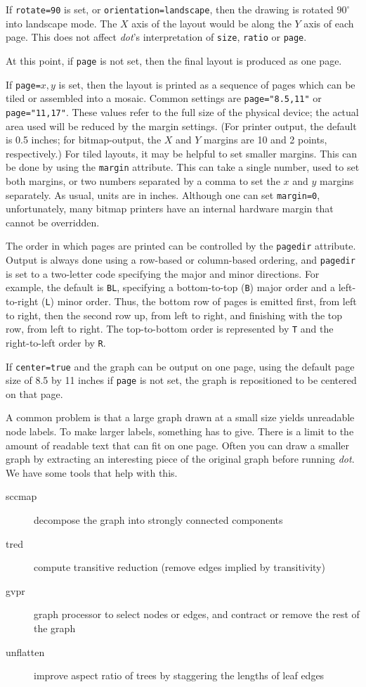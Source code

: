 \documentclass[11pt]{article}
\def\dot{{\it dot}}
\begin{document}
If \verb"rotate=90" is set, or {\tt orientation=landscape}, 
then the drawing is rotated $90^\circ$ into landscape mode.
The $X$ axis of the layout would be along the $Y$ axis of each page.
This does not affect \dot's interpretation of \verb"size",
\verb"ratio" or \verb"page".

At this point, if \verb"page" is not set, then the final layout is
produced as one page.

If \verb"page="$x,y$ is set, then the layout is printed as a sequence
of pages which can be tiled or assembled into a mosaic. Common settings
are \verb'page="8.5,11"' or \verb'page="11,17"'.  These values
refer to the full size of the physical device; the actual area used
will be reduced by the margin settings.
(For printer output, the default is 0.5 inches;
for bitmap-output, the $X$ and $Y$
margins are 10 and 2 points, respectively.)
For tiled layouts, it may be helpful to set smaller margins. 
This can be done
by using the {\tt margin} attribute. This can take a single number,
used to set both margins, or two numbers separated by a comma to set the
$x$ and $y$ margins separately. As usual, units are in inches. Although one can
set \verb"margin=0", unfortunately, many bitmap printers have an
internal hardware margin that cannot be overridden.

The order in which pages are printed can be controlled by the
{\tt pagedir} attribute. Output is always done using a row-based or
column-based ordering,
and {\tt pagedir} is set to a two-letter code specifying the major
and minor directions. For example, the default is {\tt BL}, specifying
a bottom-to-top ({\tt B}) major order and a left-to-right ({\tt L}) 
minor order. Thus,
the bottom row of pages is emitted first, from left to right, then the
second row up, from left to right, and finishing with the top row,
from left to right. The top-to-bottom order is represented by {\tt T}
and the right-to-left order by {\tt R}.

If {\tt center=true} and the graph can be output on one page, using the
default page size of 8.5 by 11 inches if {\tt page} is not set, the
graph is repositioned to be centered on that page.

A common problem is that a large graph drawn at a small size
yields unreadable node labels.
To make larger labels, something has to give.
There is a limit to the amount of readable text that can fit on one page.
Often you can draw a smaller graph by extracting an interesting
piece of the original graph before running \dot.
We have some tools that help with this.
\begin{description}
\item [sccmap] decompose the graph into strongly connected components
\item [tred] compute transitive reduction (remove edges implied by transitivity)
\item [gvpr] graph processor to select nodes or edges, and contract 
or remove the rest of the graph
\item [unflatten] improve aspect ratio of trees by staggering the lengths 
of leaf edges
\end{description}
\end{document}
